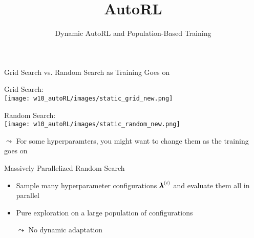 \documentclass[aspectratio=169]{../latex_main/tntbeamer}  %
\title[AutoRL]{AutoRL}
\subtitle{Dynamic AutoRL and Population-Based Training}
\begin{document}
	
	\maketitle

\begin{frame}[c]{Grid Search vs. Random Search as Training Goes on}
	
\centering
Grid Search:\\
\texttt{[image: w10\_autoRL/images/static\_grid\_new.png]} 

\bigskip
Random Search:\\
\texttt{[image: w10\_autoRL/images/static\_random\_new.png]}

$\leadsto$ For some hyperparamters, you might want to change them as the training goes on
\end{frame}
\begin{frame}[c]{Massively Parallelized Random Search}


\bigskip
\begin{itemize}
	\item Sample many hyperparameter configurations ${\pmb{\lambda}}^{(i)}$ and evaluate them all in parallel
	\pause
	\item Pure exploration on a large population of configurations
	\pause
	\item[$\leadsto$] No dynamic adaptation
\end{itemize}

\end{frame}
\end{document}
